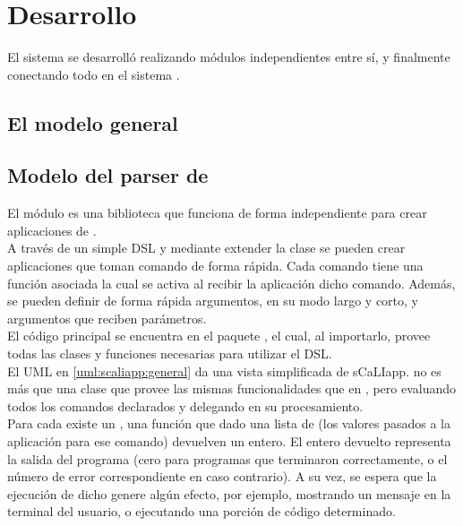 \setcounter{figure}{0}
\renewcommand{\figurename}{UML}

\section{Desarrollo}

El sistema se desarrolló realizando módulos independientes entre sí, y finalmente conectando todo en el sistema \fronttier.\\

\subsection{El modelo general}

\subsection{Modelo del parser de \cli}

El módulo \scaliapp es una biblioteca que funciona de forma independiente para crear aplicaciones de \cli.\\
A través de un simple DSL y mediante extender la clase \scaliapp se pueden crear aplicaciones que toman comando de forma rápida. Cada comando tiene una función asociada la cual se activa al recibir la aplicación dicho comando. Además, se pueden definir de forma rápida argumentos, en su modo largo y corto, \flags y argumentos que reciben parámetros.\\
El código principal se encuentra en el paquete , el cual, al importarlo, provee todas las clases y funciones necesarias para utilizar el DSL.\\
El UML en \ref{uml:scaliapp:general} da una vista simplificada de sCaLIapp. \scaliapp no es más que una clase que provee las mismas funcionalidades que  en \scala, pero evaluando todos los comandos declarados y delegando en  su procesamiento.\\
Para cada  existe un , una función que dado una lista de  (los valores pasados a la aplicación para ese comando) devuelven un entero. El entero devuelto representa la salida del programa (cero para programas que terminaron correctamente, o el número de error correspondiente en caso contrario). A su vez, se espera que la ejecución de dicho  genere algún efecto, por ejemplo, mostrando un mensaje en la terminal del usuario, o ejecutando una porción de código determinado.\\

